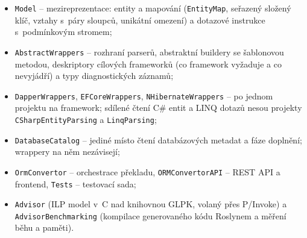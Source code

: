 \documentclass{article}
\begin{document}
\begin{itemize}[leftmargin=*,itemsep=0pt]
\item \texttt{Model} -- mezireprezentace: entity a mapování (\texttt{EntityMap}, seřazený složený klíč, vztahy s~páry sloupců, unikátní omezení) a dotazové instrukce s~podmínkovým stromem;
\item \texttt{AbstractWrappers} -- rozhraní parserů, abstraktní buildery se šablonovou metodou, deskriptory cílových frameworků (co framework vyžaduje a co nevyjádří) a typy diagnostických záznamů;
\item \texttt{DapperWrappers}, \texttt{EFCoreWrappers}, \texttt{NHibernateWrappers} -- po jednom projektu na framework; sdílené čtení C\# entit a LINQ dotazů nesou projekty \texttt{CSharpEntityParsing} a \texttt{LinqParsing};
\item \texttt{DatabaseCatalog} -- jediné místo čtení databázových metadat a fáze doplnění; wrappery na něm nezávisejí;
\item \texttt{OrmConvertor} -- orchestrace překladu, \texttt{ORMConvertorAPI} -- REST API a frontend, \texttt{Tests} -- testovací sada;
\item \texttt{Advisor} (ILP model v~C nad knihovnou GLPK, volaný přes P/Invoke) a \texttt{AdvisorBenchmarking} (kompilace generovaného kódu Roslynem a měření běhu a paměti).
\end{itemize}
\end{document}
